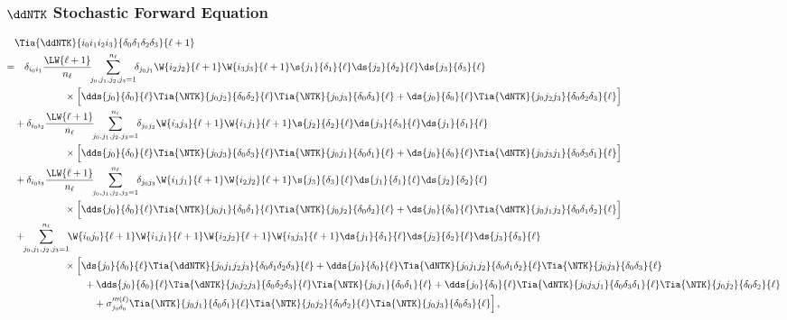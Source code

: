 \subsubsection{$\ddNTK$ Stochastic Forward Equation}
\begin{align}\label{eq:ddNTK-forward-equation}
&\Tia{\ddNTK}{i_0i_1i_2i_3}{\delta_0\delta_1\delta_2\delta_3}{\ell+1}\, \\
=&\ \ \ \delta_{i_0i_1}\frac{\LW{\ell+1}}{n_{\ell}}\!\!\sum_{j_0,j_1,j_2,j_3=1}^{n_{\ell}}\!\!\delta_{j_0j_1}\W{i_2j_2}{\ell+1}\W{i_3j_3}{\ell+1}\s{j_1}{\delta_1}{\ell}\ds{j_2}{\delta_2}{\ell}\ds{j_3}{\delta_3}{\ell} \, \notag \\
&\qquad\qquad\quad\times\Big[\dds{j_0}{\delta_0}{\ell}\Tia{\NTK}{j_0j_2}{\delta_0\delta_2}{\ell}\Tia{\NTK}{j_0j_3}{\delta_0\delta_3}{\ell}+\ds{j_0}{\delta_0}{\ell}\Tia{\dNTK}{j_0j_2j_3}{\delta_0\delta_2\delta_3}{\ell}\Big]\, \notag\\
&+\delta_{i_0i_2}\frac{\LW{\ell+1}}{n_{\ell}}\!\!\sum_{j_0,j_1,j_2,j_3=1}^{n_{\ell}}\!\!\delta_{j_0j_2}\W{i_3j_3}{\ell+1}\W{i_1j_1}{\ell+1}\s{j_2}{\delta_2}{\ell}\ds{j_3}{\delta_3}{\ell}\ds{j_1}{\delta_1}{\ell} \, \notag \\
&\qquad\qquad\quad\times\Big[\dds{j_0}{\delta_0}{\ell}\Tia{\NTK}{j_0j_3}{\delta_0\delta_3}{\ell}\Tia{\NTK}{j_0j_1}{\delta_0\delta_1}{\ell}+\ds{j_0}{\delta_0}{\ell}\Tia{\dNTK}{j_0j_3j_1}{\delta_0\delta_3\delta_1}{\ell}\Big]\, \notag\\
&+\delta_{i_0i_3}\frac{\LW{\ell+1}}{n_{\ell}}\!\!\sum_{j_0,j_1,j_2,j_3=1}^{n_{\ell}}\!\!\delta_{j_0j_3}\W{i_1j_1}{\ell+1}\W{i_2j_2}{\ell+1}\s{j_3}{\delta_3}{\ell}\ds{j_1}{\delta_1}{\ell}\ds{j_2}{\delta_2}{\ell}\, \notag \\
&\qquad\qquad\quad\times\Big[\dds{j_0}{\delta_0}{\ell}\Tia{\NTK}{j_0j_1}{\delta_0\delta_1}{\ell}\Tia{\NTK}{j_0j_2}{\delta_0\delta_2}{\ell}+\ds{j_0}{\delta_0}{\ell}\Tia{\dNTK}{j_0j_1j_2}{\delta_0\delta_1\delta_2}{\ell}\Big]\, \notag\\
&+\!\!\sum_{j_0,j_1,j_2,j_3=1}^{n_{\ell}}\!\!\W{i_0j_0}{\ell+1}\W{i_1j_1}{\ell+1}\W{i_2j_2}{\ell+1}\W{i_3j_3}{\ell+1}\ds{j_1}{\delta_1}{\ell}\ds{j_2}{\delta_2}{\ell}\ds{j_3}{\delta_3}{\ell}\, \notag\\
&\qquad\qquad\quad\times\Big[\ds{j_0}{\delta_0}{\ell}\Tia{\ddNTK}{j_0j_1j_2j_3}{\delta_0\delta_1\delta_2\delta_3}{\ell}
+\dds{j_0}{\delta_0}{\ell}\Tia{\dNTK}{j_0j_1j_2}{\delta_0\delta_1\delta_2}{\ell}\Tia{\NTK}{j_0j_3}{\delta_0\delta_3}{\ell}
\, \notag\\
&\qquad\qquad\quad\qquad
+\dds{j_0}{\delta_0}{\ell}\Tia{\dNTK}{j_0j_2j_3}{\delta_0\delta_2\delta_3}{\ell}\Tia{\NTK}{j_0j_1}{\delta_0\delta_1}{\ell}
+\dds{j_0}{\delta_0}{\ell}\Tia{\dNTK}{j_0j_3j_1}{\delta_0\delta_3\delta_1}{\ell}\Tia{\NTK}{j_0j_2}{\delta_0\delta_2}{\ell}
\, \notag\\
&\qquad\qquad\qquad\qquad
+\sigma^{\prime\prime\prime(\ell)}_{j_0\delta_0}\Tia{\NTK}{j_0j_1}{\delta_0\delta_1}{\ell}\Tia{\NTK}{j_0j_2}{\delta_0\delta_2}{\ell}\Tia{\NTK}{j_0j_3}{\delta_0\delta_3}{\ell}
\Big]\, ,\notag
\end{align}

